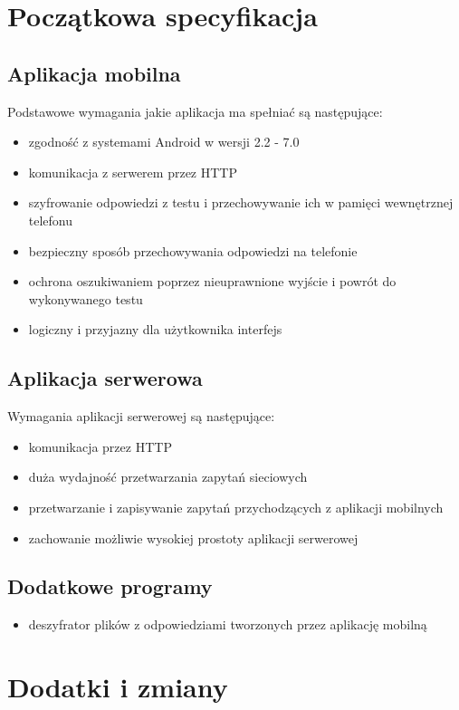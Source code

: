 \documentclass{report}
\begin{document}
		\section{Początkowa specyfikacja}
		
			\subsection{Aplikacja mobilna}
			Podstawowe wymagania jakie aplikacja ma spełniać są następujące:
			\begin{itemize}
				\item zgodność z systemami Android w wersji 2.2 - 7.0
				\item komunikacja z serwerem przez HTTP
				\item szyfrowanie odpowiedzi z testu i przechowywanie ich w pamięci wewnętrznej telefonu
				\item bezpieczny sposób przechowywania odpowiedzi na telefonie
				\item ochrona oszukiwaniem poprzez nieuprawnione wyjście i powrót do wykonywanego testu
				\item logiczny i przyjazny dla użytkownika interfejs
			\end{itemize}
		
			\subsection{Aplikacja serwerowa}
			Wymagania aplikacji serwerowej są następujące:
			\begin{itemize}
				\item komunikacja przez HTTP
				\item duża wydajność przetwarzania zapytań sieciowych
				\item przetwarzanie i zapisywanie zapytań przychodzących z aplikacji mobilnych
				\item zachowanie możliwie wysokiej prostoty aplikacji serwerowej
			\end{itemize}
		
			\subsection{Dodatkowe programy}
			\begin{itemize}
				\item deszyfrator plików z odpowiedziami tworzonych przez aplikację mobilną
			\end{itemize}
		
		\section{Dodatki i zmiany}
		
\end{document}
